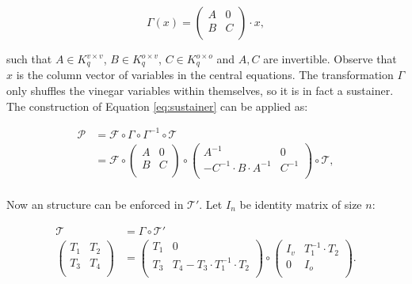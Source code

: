 \documentclass{ufsctex/ufsctex}
\begin{document}
\begin{equation}
\Gamma(x) =
\begin{pmatrix}
A & 0 \\
B & C \\
\end{pmatrix} \cdot x,
\end{equation}

\noindent
such that $A \in K^{v \times v}_q$, $B \in K^{o \times v}_q$, $C \in K^{o
\times o}_q$ and $A, C$ are invertible. Observe that $x$ is the column vector
of variables in the central equations. The transformation $\Gamma$ only
shuffles the vinegar variables within themselves, so it is in fact a sustainer.
The construction of Equation \ref{eq:sustainer} can be applied as:

\begin{equation}
\begin{split}
\mathcal{P} &= \mathcal{F} \circ \Gamma \circ \Gamma^{-1} \circ \mathcal{T} \\
&=
\mathcal{F} \circ
\begin{pmatrix}
A & 0 \\
B & C \\
\end{pmatrix}
\circ
\begin{pmatrix}
A^{-1} & 0 \\
-C^{-1} \cdot B \cdot A^{-1} & C^{-1} \\
\end{pmatrix}
\circ
\mathcal{T}, \\
\end{split}
\end{equation}

Now an structure can be enforced in $\mathcal{T'}$. Let $I_n$ be identity
matrix of size $n$:

\begin{equation}
\begin{split}
\mathcal{T} &= \Gamma \circ \mathcal{T'} \\
\begin{pmatrix}
T_1 & T_2 \\
T_3 & T_4 \\
\end{pmatrix}
&=
\begin{pmatrix}
T_1 & 0 \\
T_3 & T_4 - T_3 \cdot T_1^{-1} \cdot T_2 \\
\end{pmatrix}
\circ
\begin{pmatrix}
I_v & T_1^{-1} \cdot T_2 \\
0 & I_o \\
\end{pmatrix}. \\
\end{split}
\end{equation}
\end{document}
